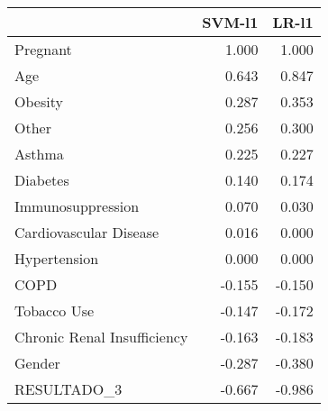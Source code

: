 \begin{tabular}{lrr}
\toprule
{} &  SVM-l1 &  LR-l1 \\
\midrule
Pregnant                    &   1.000 &  1.000 \\
Age                         &   0.643 &  0.847 \\
Obesity                     &   0.287 &  0.353 \\
Other                       &   0.256 &  0.300 \\
Asthma                      &   0.225 &  0.227 \\
Diabetes                    &   0.140 &  0.174 \\
Immunosuppression           &   0.070 &  0.030 \\
Cardiovascular Disease      &   0.016 &  0.000 \\
Hypertension                &   0.000 &  0.000 \\
COPD                        &  -0.155 & -0.150 \\
Tobacco Use                 &  -0.147 & -0.172 \\
Chronic Renal Insufficiency &  -0.163 & -0.183 \\
Gender                      &  -0.287 & -0.380 \\
RESULTADO\_3                 &  -0.667 & -0.986 \\
\bottomrule
\end{tabular}
